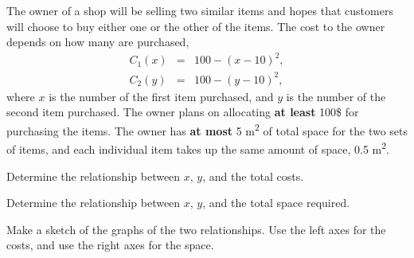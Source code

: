 \begin{problem}
\clearpage

\item The owner of a shop will be selling two similar items and hopes
  that customers will choose to buy either one or the other of the
  items. The cost to the owner depends on how many are purchased,
  \begin{eqnarray*}
    C_1(x) & = & 100 - (x-10)^2, \\
    C_2(y) & = & 100 - (y-10)^2,
  \end{eqnarray*}
  where $x$ is the number of the first item purchased, and $y$ is the
  number of the second item purchased. The owner plans on allocating
  \textbf{at least} 100\$ for purchasing the items.  The owner has
  \textbf{at most} 5 m\textsuperscript{2} of total space for the two
  sets of items, and each individual item takes up the same amount of
  space, 0.5 m\textsuperscript{2}.

  \begin{subproblem}
    
  \item Determine the relationship between $x$, $y$, and the total
    costs.

    \vfill

  \item Determine the relationship between $x$, $y$, and the total
    space required.

    \vfill

  \item Make a sketch of the graphs of the two relationships. Use the
    left axes for the costs, and use the right axes for the space.


\end{subproblem}
\end{problem}
